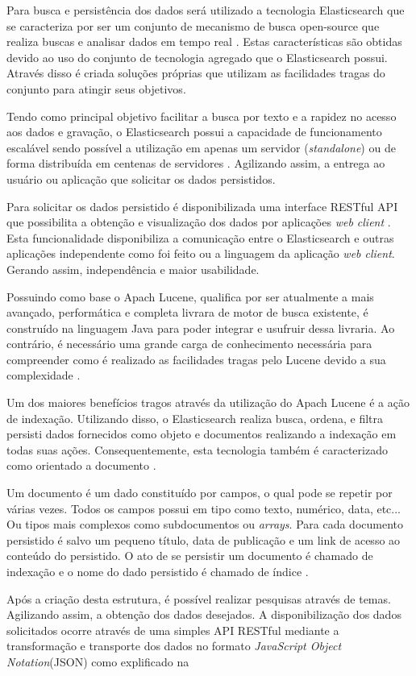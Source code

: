 Para busca e persistência dos dados será utilizado a tecnologia Elasticsearch que se caracteriza por ser um conjunto de mecanismo de busca open-source que realiza buscas e analisar dados em tempo real \cite{Gil:2010}. Estas características são obtidas devido ao uso do conjunto de tecnologia agregado que o Elasticsearch possui. Através disso é criada soluções próprias que utilizam as  facilidades tragas do conjunto para atingir seus objetivos.

Tendo como principal objetivo facilitar a busca por texto e a rapidez no acesso aos dados e gravação, o Elasticsearch possui a capacidade de funcionamento escalável sendo possível a utilização em apenas um servidor (\textit{standalone}) ou de forma distribuída em centenas de servidores \cite{Gormley:2015}. Agilizando assim, a entrega ao usuário ou aplicação que solicitar os dados persistidos.

Para solicitar os dados persistido é disponibilizada uma interface RESTful API que possibilita a obtenção e visualização dos dados por aplicações \textit{web client} \cite{Gormley:2015}. Esta funcionalidade disponibiliza a comunicação entre o Elasticsearch e outras aplicações independente como foi feito ou a linguagem da aplicação \textit{web client}. Gerando assim, independência e maior usabilidade.

Possuindo como base o Apach Lucene, qualifica por ser atualmente a mais avançado, performática e completa livrara de motor de busca existente, é construído na linguagem Java para poder integrar e usufruir dessa livraria. Ao contrário, é necessário uma grande carga de conhecimento necessária para compreender como é realizado as facilidades tragas pelo Lucene devido a sua complexidade \cite{Gormley:2015}.

Um dos maiores benefícios tragos através da utilização do Apach Lucene é a ação de indexação. Utilizando disso, o Elasticsearch realiza busca, ordena, e filtra persisti dados fornecidos como objeto e documentos realizando a indexação em todas suas ações. Consequentemente, esta tecnologia também é caracterizado como orientado a documento \cite{Gormley:2015}.

Um documento é um dado constituído por campos, o qual pode se repetir por várias vezes. Todos os campos possui em tipo como texto, numérico, data, etc... Ou tipos mais complexos como subdocumentos ou \textit{arrays}. Para cada documento persistido é salvo um pequeno título, data de publicação e um link de acesso ao conteúdo do persistido. O ato de se persistir um documento é chamado de indexação e o nome do dado persistido é chamado de índice \cite{Kuc:2013}.

Após a criação desta estrutura, é possível realizar pesquisas através de temas. Agilizando assim, a obtenção dos dados desejados. A disponibilização dos dados solicitados ocorre através de uma simples API RESTful mediante a transformação e transporte dos dados no formato \textit{JavaScript Object Notation}(JSON) como explificado na 
